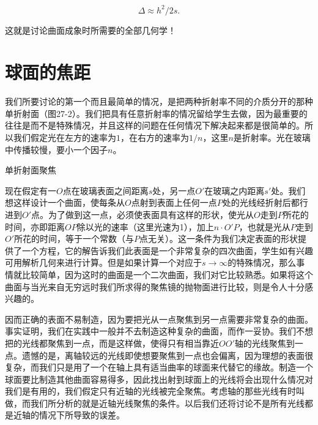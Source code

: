\documentclass[12pt,oneside]{book}
\begin{document}
\begin{common-format}
\begin{equation}
\label{Eq:I:27:1}
\Delta \approx h^2/2s.
\end{equation}

这就是讨论曲面成象时所需要的全部几何学！



\section{球面的焦距}
我们所要讨论的第一个而且最简单的情况，是把两种折射率不同的介质分开的那种单折射面（图27-2）。我们把具有任意折射率的情况留给学生去做，因为最重要的往往是而不是特殊情况，并且这样的问题在任何情况下解决起来都是很简单的。所以我们假定光在左方的速率为$ 1 $，在右方的速率为$ 1/n $，这里$ n $是折射率。光在玻璃中传播较慢，要小一个因子$ n $。

\begin{fig}{单折射面聚焦}
\label{fig:单折射面聚焦}
\end{fig}

现在假定有一$ O $点在玻璃表面之间距离$ s $处，另一点$ O' $在玻璃之内距离$ s' $处。我们想这样设计一个曲面，使每条从$ O $点射到表面上任何一点$ P $处的光线经折射后都行进到$ O' $点。为了做到这一点，必须使表面具有这样的形状，使光从$ O $走到$ P $所花的时间，亦即距离$ OP $除以光的速率（这里光速为1），加上$ n \cdot O'P $，也就是光从$ P $走到$ O' $所花的时间，等于一个常数（与$ P $点无关）。这一条件为我们决定表面的形状提供了一个方程，它的解告诉我们此表面是一个非常复杂的四次曲面，学生如有兴趣可用解析几何来进行计算。但是如果计算一个对应于$ s \to \infty $的特殊情况，那么事情就比较简单，因为这时的曲面是一个二次曲面，我们对它比较熟悉。如果将这个曲面与当光来自无穷远时我们所求得的聚焦镜的抛物面进行比较，则是令人十分感兴趣的。

因而正确的表面不易制造，因为要把光从一点聚焦到另一点需要非常复杂的曲面。事实证明，我们在实践中一般并不去制造这种复杂的曲面，而作一妥协。我们不想把的光线都聚焦到一点，而是这样做，使得只有相当靠近$ OO' $轴的光线聚焦到一点。遗憾的是，离轴较远的光线即使想要聚焦到一点也会偏离，因为理想的表面很复杂，而我们只是用了一个在轴上具有适当曲率的球面来代替它的缘故。制造一个球面要比制造其他曲面容易得多，因此找出射到球面上的光线将会出现什么情况对我们是有用的，我们假定只有近轴的光线被完全聚焦。考虑轴的那些光线有时叫做，而我们所分析的就是近轴光线聚焦的条件。以后我们还将讨论不是所有光线都是近轴的情况下所导致的误差。


\end{common-format}
\end{document}
